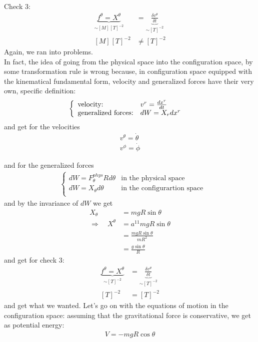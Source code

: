 Check 3:
\begin{align}
\underbrace{f^{\theta} = X^{\theta}}_{\sim [M]^{}[T]^{-2}}&= \underbrace{\frac{\delta v^{\theta}}{\delta t}}_{\sim [T]^{-2}}\\
[M]^{}[T]^{-2}&\neq[T]^{-2} 
\end{align}
Again, we ran into problems.\\
In fact, the idea of going from the physical space into the configuration space, by some transformation rule is wrong because, in configuration space equipped with the kinematical fundamental form, velocity and generalized forces have their very own, specific  definition: 
\begin{align}
&\left\{\begin{array}{ll}
\text{velocity:}& v^r = \dv{x^r}{t}\\
\text{generalized forces:}&dW = X_rdx^r
\end{array}\right.
\end{align}
and get for the velocities
\begin{align}
v^{\theta} = \dot{\theta}\\ 
v^{\phi} = \dot{\phi}
\end{align}

and for the generalized forces
\begin{align}
&\left\{\begin{array}{ll}
dW = F_{\theta}^{phys}Rd\theta&\text{in the physical space}\\
dW = X_{\theta}d\theta&\text{in the configurartion space}\\
\end{array}\right.
\end{align}
and by the invariance of $dW$ we get
\begin{align}
X_{\theta}&=  mgR\sin{\theta}\\
\Rightarrow\quad X^{\theta}&=  a^{11}mgR\sin{\theta}\\
&= \frac{mgR\sin{\theta}}{mR^2}\\
&= \frac{g\sin{\theta}}{R}
\end{align}
and get for check 3:
\begin{align}
\underbrace{f^{\theta} = X^{\theta}}_{\sim [T]^{-2}}&= \underbrace{\frac{\delta v^{\theta}}{\delta t}}_{\sim [T]^{-2}}\\
[T]^{-2}&=[T]^{-2} 
\end{align}
and get what we wanted.
\newpage
Let's go on with the equations of motion in the configuration space:
assuming that the gravitational force is conservative, we get as potential energy:
\begin{align}
V = -mgR \cos{\theta}
\end{align}

